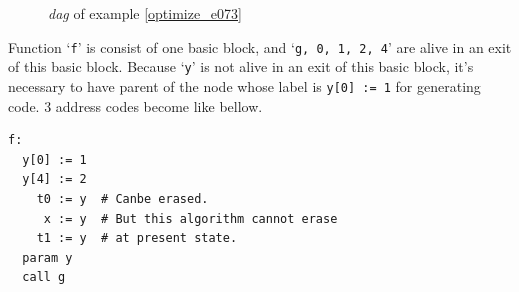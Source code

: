 \begin{Example}
\begin{figure}[htbp]
\begin{center}
\begin{latexonly}
\end{latexonly}
\caption{{\em dag} of example \ref{optimize_e073}}
\label{optimize_e074}
\end{center}
\end{figure}
Function `{\tt{f}}' is consist of one basic block, and 
`{\tt{g, 0, 1, 2, 4}}' are alive in an exit of this basic block.
Because `{\tt{y}}' is not alive in an exit of this basic block,
it's necessary to have parent of the node whose label is {\tt{y[0] := 1}}
for generating code.
3 address codes become like bellow.
\begin{verbatim}
f:
  y[0] := 1
  y[4] := 2
    t0 := y  # Canbe erased.
     x := y  # But this algorithm cannot erase
    t1 := y  # at present state.
  param y
  call g
\end{verbatim}
\end{Example}

